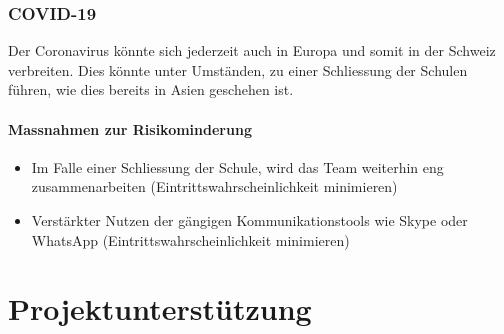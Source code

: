 \documentclass[11pt]{article}
\begin{document}
\subsubsection{COVID-19}
Der Coronavirus könnte sich jederzeit auch in Europa und somit in der Schweiz verbreiten. Dies könnte unter Umständen, zu einer Schliessung der Schulen führen, wie dies bereits in Asien geschehen ist.
\paragraph{Massnahmen zur Risikominderung}
\begin{itemize}
\item Im Falle einer Schliessung der Schule, wird das Team weiterhin eng zusammenarbeiten (Eintrittswahrscheinlichkeit minimieren)
\item Verstärkter Nutzen der gängigen Kommunikationstools wie Skype oder WhatsApp (Eintrittswahrscheinlichkeit minimieren)
\end{itemize}





\section{Projektunterstützung}
\end{document}
